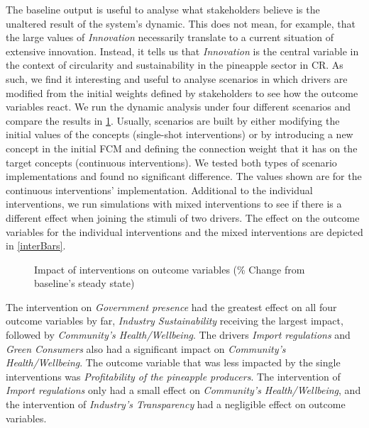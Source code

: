 The baseline output is useful to analyse what stakeholders believe is the unaltered result of the system's dynamic. This does not mean, for example, that the large values of \textit{Innovation} necessarily translate to a current situation of extensive innovation. Instead, it tells us that \textit{Innovation} is the central variable in the context of circularity and sustainability in the pineapple sector in CR. As such, we find it interesting and useful to analyse scenarios in which drivers are modified from the initial weights defined by stakeholders to see how the outcome variables react. We run the dynamic analysis under four different scenarios and compare the results in \cref{interTable}. Usually, scenarios are built by either modifying the initial values of the concepts (single-shot interventions) or by introducing a new concept in the initial FCM and defining the connection weight that it has on the target concepts (continuous interventions). We tested both types of scenario implementations and found no significant difference. The values shown are for the continuous interventions' implementation. Additional to the individual interventions, we run simulations with mixed interventions to see if there is a different effect when joining the stimuli of two drivers. The effect on the outcome variables for the individual interventions and the mixed interventions are depicted in \cref{interBars}.


\begin{figure}[ht]
\caption{Impact of interventions on outcome variables (\% Change from baseline's steady state)} 
\label{interTable}
\centering

\end{figure}


The intervention on \textit{Government presence} had the greatest effect on all four outcome variables by far, \textit{Industry Sustainability} receiving the largest impact, followed by \textit{Community's Health/Wellbeing}. The drivers \textit{Import regulations} and \textit{Green Consumers} also had a significant impact on \textit{Community's Health/Wellbeing}. The outcome variable that was less impacted by the single interventions was \textit{Profitability of the pineapple producers}. The intervention of \textit{Import regulations} only had a small effect on \textit{Community's Health/Wellbeing}, and the intervention of \textit{Industry's Transparency} had a negligible effect on outcome variables.  

